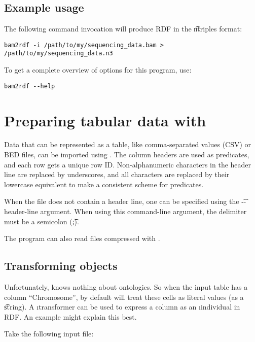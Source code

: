 \subsection{Example usage}

The following command invocation will produce RDF in the \t{ntriples}
format:

\begin{lstlisting}
bam2rdf -i /path/to/my/sequencing_data.bam > /path/to/my/sequencing_data.n3
\end{lstlisting}

To get a complete overview of options for this program, use:

\begin{lstlisting}
bam2rdf --help
\end{lstlisting}

\section{Preparing tabular data with }
\label{sec:table2rdf}

  Data that can be represented as a table, like comma-separated values (CSV)
  or BED files, can be imported using .  The column headers
  are used as predicates, and each row gets a unique row ID.  Non-alphanumeric
  characters in the header line are replaced by underscores, and all characters
  are replaced by their lowercase equivalent to make a consistent scheme for
  predicates.

  When the file does not contain a header line, one can be specified using the
  \t{-{}-header-line} argument.  When using this command-line argument, the
  delimiter must be a semicolon (\t{;}).

  The program can also read files compressed with .

\subsection{Transforming objects}

  Unfortunately,  knows nothing about ontologies.  So when
  the input table has a column ``Chromosome'', by default 
  will treat these cells as literal values (as a \t{string}).  A
  \i{transformer} can be used to express a column as an \i{individual} in
  RDF.  An example might explain this best.

  Take the following input file:

